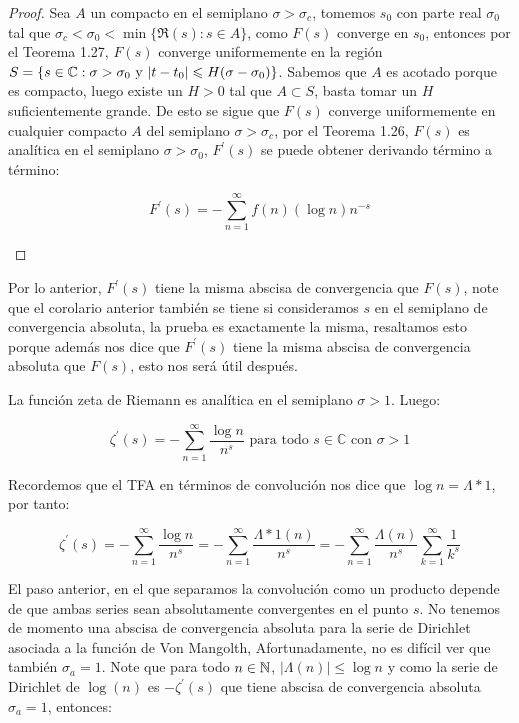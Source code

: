 \begin{proof}
Sea $A$ un compacto en el semiplano $\sigma>\sigma_c$, tomemos $s_0$ con parte real $\sigma_0$ tal que $\sigma_c<\sigma_0<\min\{\Re(s): s\in A\}$, como $F(s)$ converge en $s_0$, entonces por el Teorema 1.27, $F(s)$ converge uniformemente en la región $S=\{s\in \mathbb{C} : \sigma>\sigma_0 \text{ y } |t-t_0|\leqslant H(\sigma-\sigma_0)\}$. Sabemos que $A$ es acotado porque es compacto, luego existe un $H>0$ tal que $A\subset S$, basta tomar un $H$ suficientemente grande. De  esto se sigue que $F(s)$ converge uniformemente en cualquier compacto $A$ del semiplano $\sigma>\sigma_c$, por el Teorema 1.26, $F(s)$ es analítica en el semiplano $\sigma>\sigma_0$, $F^{\prime}(s)$ se puede obtener derivando término a término:

$$F^{\prime}(s)=-\sum_{n=1}^{\infty} f(n)(\log n) n^{-s}$$
\begin{center}

\end{center}
\end{proof}

\begin{note}
Por lo anterior, $F^{\prime}(s)$ tiene la misma abscisa de convergencia que $F(s)$, note que el corolario anterior también se tiene si consideramos $s$ en el semiplano de convergencia absoluta, la prueba es exactamente la misma, resaltamos esto porque además nos dice que $F^{\prime}(s)$ tiene la misma abscisa de convergencia absoluta que $F(s)$, esto nos será útil después.\cite{apostol1998introduction}
\end{note}

\begin{corollary}
La función zeta de Riemann es analítica en el semiplano $\sigma>1$. Luego:

$$\zeta^{\prime}(s)=-\sum_{n=1}^{\infty}\frac{\log n}{n^s} \text{ para todo } s \in \mathbb{C} \text{ con } \sigma>1$$
\end{corollary}

Recordemos que el TFA en términos de convolución nos dice que $\log n=\Lambda*1$, por tanto:

$$\zeta^{\prime}(s)=-\sum_{n=1}^{\infty}\frac{\log n}{n^s}=-\sum_{n=1}^{\infty}\frac{\Lambda *1(n)}{n^s}=-\sum_{n=1}^{\infty}\frac{\Lambda(n)}{n^s}\sum_{k=1}^{\infty} \frac{1}{k^s} $$

El paso anterior, en el que separamos la convolución como un producto depende de que ambas series sean absolutamente convergentes en el punto $s$. No tenemos de momento una abscisa de convergencia absoluta  para la serie de Dirichlet asociada a la función de Von Mangolth, Afortunadamente, no es difícil ver que también $\sigma_a=1$. Note que para todo $n\in \mathbb{N}$, $|\Lambda(n)|\leq \log n$ y como la serie de Dirichlet de $\log(n)$ es $-\zeta^{\prime}(s)$ que tiene abscisa de convergencia absoluta $\sigma_a=1$, entonces:

